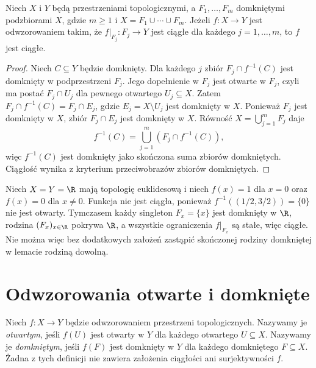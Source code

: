 \begin{twierdzenie}
\label{thm:topog-sklejanie-domkniete}
Niech $X$ i $Y$ będą przestrzeniami topologicznymi,
a $F_1,\ldots,F_m$ domkniętymi podzbiorami $X$, gdzie
$m\ge1$ i $X=F_1\cup\cdots\cup F_m$.
Jeżeli $f\colon X\to Y$ jest odwzorowaniem takim, że
$f|_{F_j}\colon F_j\to Y$ jest ciągłe dla każdego
$j=1,\ldots,m$, to $f$ jest ciągłe.
\end{twierdzenie}
\begin{proof}
Niech $C\subseteq Y$ będzie domknięty. Dla każdego
$j$ zbiór $F_j\cap f^{-1}(C)$ jest domknięty
w podprzestrzeni $F_j$. Jego dopełnienie w $F_j$ jest
otwarte w $F_j$, czyli ma postać $F_j\cap U_j$
dla pewnego otwartego $U_j\subseteq X$.
Zatem $F_j\cap f^{-1}(C)=F_j\cap E_j$,
gdzie $E_j=X\setminus U_j$ jest domknięty w $X$.
Ponieważ $F_j$ jest domknięty w $X$, zbiór
$F_j\cap E_j$ jest domknięty w $X$.
Równość $X=\bigcup_{j=1}^{m}F_j$ daje
\[
f^{-1}(C)=\bigcup_{j=1}^{m}(F_j\cap f^{-1}(C)),
\]
więc $f^{-1}(C)$ jest domknięty jako skończona suma
zbiorów domkniętych. Ciągłość wynika z kryterium
przeciwobrazów zbiorów domkniętych.
\end{proof}

\begin{przyklad}
\label{ex:topog-sklejanie-nieskonczone}
Niech $X=Y=\R$ mają topologię euklidesową i niech
$f(x)=1$ dla $x=0$ oraz $f(x)=0$ dla $x\ne0$.
Funkcja nie jest ciągła, ponieważ
$f^{-1}((1/2,3/2))=\{0\}$ nie jest otwarty.
Tymczasem każdy singleton $F_x=\{x\}$ jest domknięty
w $\R$, rodzina $(F_x)_{x\in\R}$ pokrywa $\R$,
a wszystkie ograniczenia $f|_{F_x}$ są stałe,
więc ciągłe. Nie można więc bez dodatkowych założeń
zastąpić skończonej rodziny domkniętej w lemacie
rodziną dowolną.
\end{przyklad}

\section{Odwzorowania otwarte i domknięte}
\label{sec:topog-otwarte-domkniete-odwzorowania}

\begin{definicja}
\label{def:topog-otwarte-domkniete-odwzorowanie}
Niech $f\colon X\to Y$ będzie odwzorowaniem przestrzeni
topologicznych. Nazywamy je \emph{otwartym}, jeśli
$f(U)$ jest otwarty w $Y$ dla każdego otwartego
$U\subseteq X$. Nazywamy je \emph{domkniętym},
jeśli $f(F)$ jest domknięty w $Y$ dla każdego
domkniętego $F\subseteq X$.
Żadna z tych definicji nie zawiera założenia ciągłości
ani surjektywności $f$.
\end{definicja}

